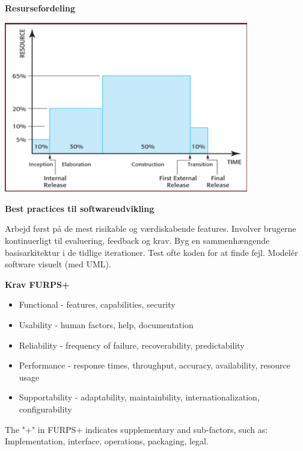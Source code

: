 \textbf{Resursefordeling}

\begin{center}
	\includegraphics[width=0.8\textwidth]{Images/resursefordeling.png}
\end{center}

\textbf{Best practices til softwareudvikling}

Arbejd først på de mest risikable og værdiskabende features.
Involver brugerne kontinuerligt til evaluering, feedback og krav.
Byg en sammenhængende basisarkitektur i de tidlige iterationer.
Test ofte koden for at finde fejl. Modelér software visuelt (med UML).


\textbf{Krav FURPS+}

\begin{itemize}
	\item{Functional - features, capabilities, security}
	\item{Usability - human factors, help, documentation}
	\item{Reliability - frequency of failure, recoverability, predictability}
	\item{Performance - response times, throughput, accuracy, availability, resource usage}
	\item{Supportability - adaptability, maintainbility, internationalization, configurability}
\end{itemize}

The "+" in FURPS+ indicates supplementary and sub-factors, such as:
Implementation, interface, operations, packaging, legal.

